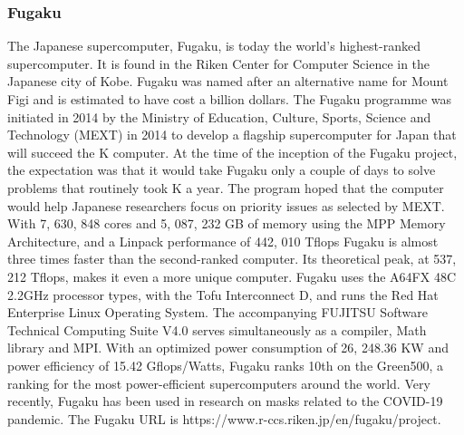 \documentclass{article}
\begin{document}
\subsubsection{Fugaku}
The Japanese supercomputer, Fugaku, is today the world's highest-ranked supercomputer. It is found in the Riken Center for Computer Science in the Japanese city of Kobe. Fugaku was named after an alternative name for Mount Figi and is estimated to have cost a billion dollars. The Fugaku programme was initiated in 2014 by the Ministry of Education, Culture, Sports, Science and Technology (MEXT) in 2014 to develop a flagship supercomputer for Japan that will succeed the K computer. At the time of the inception of the Fugaku project, the expectation was that it would take Fugaku only a couple of days to solve problems that routinely took K a year. The program hoped that the computer would help Japanese researchers focus on priority issues as selected by MEXT. With 7, 630, 848 cores and 5, 087, 232 GB of memory using the MPP Memory Architecture, and a Linpack performance of 442, 010 Tflops Fugaku is almost three times faster than the second-ranked computer. Its theoretical peak, at 537, 212 Tflops, makes it even a more unique computer. Fugaku uses the A64FX 48C 2.2GHz processor types, with the Tofu Interconnect D, and runs the Red Hat Enterprise Linux Operating System. The accompanying FUJITSU Software Technical Computing Suite V4.0 serves simultaneously as a compiler, Math library and MPI. With an optimized power consumption of 26, 248.36 KW and power efficiency of 15.42 Gflops/Watts, Fugaku ranks 10th on the Green500, a ranking for the most power-efficient supercomputers around the world. Very recently, Fugaku has been used in research on masks related to the COVID-19 pandemic. The Fugaku URL is https://www.r-ccs.riken.jp/en/fugaku/project.
\end{document}
